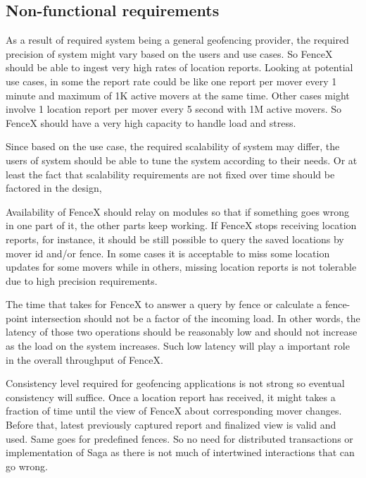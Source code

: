 \documentclass[a4]{report}
\begin{document}
    \subsection{Non-functional requirements}
    As a result of required system being a general geofencing provider, the required precision of system might vary
    based on the users and use cases.
    So FenceX should be able to ingest very high rates of location reports.
    Looking at potential use cases, in some the report rate could be like one report per mover every 1 minute and
    maximum of 1K active movers at the same time.
    Other cases might involve 1 location report per mover every 5 second with 1M active movers.
    So FenceX should have a very high capacity to handle load and stress.

    Since based on the use case, the required scalability of system may differ, the users of system should be able to
    tune the system according to their needs.
    Or at least the fact that scalability requirements are not fixed over time should be factored in the design,

    Availability of FenceX should relay on modules so that if something goes wrong in one part of it, the other parts
    keep working.
    If FenceX stops receiving location reports, for instance, it should be still possible to query the saved
    locations by mover id and/or fence.
    In some cases it is acceptable to miss some location updates for some movers while in others, missing location
    reports is not tolerable due to high precision requirements.

    The time that takes for FenceX to answer a query by fence or calculate a fence-point intersection should not be a
    factor of the incoming load.
    In other words, the latency of those two operations should be reasonably low and should not increase as the load
    on the system increases.
    Such low latency will play a important role in the overall throughput of FenceX.

    Consistency level required for geofencing applications is not strong so eventual consistency will suffice.
    Once a location report has received, it might takes a fraction of time until the view of FenceX about
    corresponding mover changes.
    Before that, latest previously captured report and finalized view is valid and used.
    Same goes for predefined fences.
    So no need for distributed transactions or implementation of Saga as there is not much of intertwined
    interactions that can go wrong.
\end{document}
